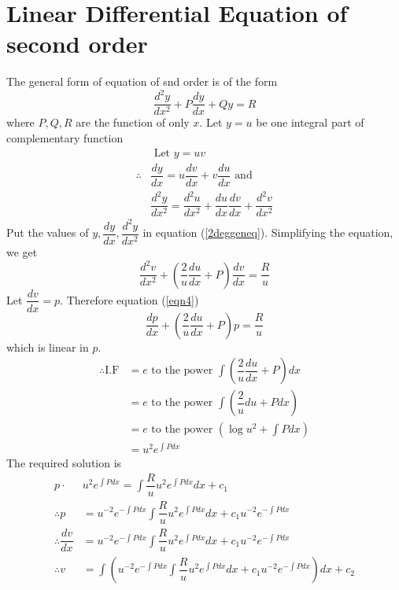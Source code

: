 \documentclass[a4paper, titlepage]{article}
\begin{document}
\section{Linear Differential Equation of second order}
The general form of equation of snd order is of the form
\begin{equation}
    \label{2deggeneq}
    \dfrac{d^2y}{dx^2} + P\dfrac{dy}{dx} + Qy = R
\end{equation}
where $P, Q, R$ are the function of only $x$.
Let $y = u$ be one integral part of complementary function
\begin{align}
    & \text{ Let } y = uv \label{eqn1} \\
    \therefore & \dfrac{dy}{dx} = u\dfrac{dv}{dx} + v\dfrac{du}{dx} \text{ and } \label{eqn2} \\
    & \dfrac{d^2y}{dx^2} = \dfrac{d^2u}{dx^2} + \dfrac{du}{dx}\dfrac{dv}{dx} + \dfrac{d^2v}{dx^2} \label{eqn3}
\end{align}
Put the values of $y, \dfrac{dy}{dx}, \dfrac{d^2y}{dx^2}$ in equation (\ref{2deggeneq}).
Simplifying the equation, we get
\begin{equation}
    \label{eqn4}
    \dfrac{d^2v}{dx^2} + \left( \dfrac{2}{u} \dfrac{du}{dx} + P \right)\dfrac{dv}{dx} = \dfrac{R}{u}
\end{equation}
Let $\dfrac{dv}{dx} = p$. Therefore equation (\ref{eqn4}) \hfill \\
\begin{equation*}
    \dfrac{dp}{dx} + \left( \dfrac{2}{u} \dfrac{du}{dx} + P \right)p = \dfrac{R}{u}
\end{equation*}
which is linear in $p$.
\begin{align*}
    \therefore \text{I.F} &= e \text{ to the power } \displaystyle\int\left( \dfrac{2}{u} \dfrac{du}{dx} + P \right)dx \\
                          &= e \text{ to the power } \displaystyle\int\left( \dfrac{2}{u}du + Pdx \right) \\
                          &= e \text{ to the power } \left( \log u^2 + \displaystyle\int Pdx \right) \\
                          &= u^2e^{\int Pdx}
\end{align*}
The required solution is 
\begin{align*}
    p\cdot & u^2e^{\int Pdx} = \displaystyle\int \dfrac{R}{u}u^2e^{\int Pdx} dx + c_1 \\
    \therefore p &= u^{-2}e^{-\int Pdx}\displaystyle\int \dfrac{R}{u}u^2e^{\int Pdx} dx + c_1u^{-2}e^{-\int Pdx} \\
    \therefore \dfrac{dv}{dx} &= u^{-2}e^{-\int Pdx}\displaystyle\int \dfrac{R}{u}u^2e^{\int Pdx} dx + c_1u^{-2}e^{-\int Pdx} \\
    \therefore v &= \displaystyle\int \left( u^{-2}e^{-\int Pdx}\displaystyle\int \dfrac{R}{u}u^2e^{\int Pdx} dx + c_1u^{-2}e^{-\int Pdx} \right) dx + c_2
\end{align*}
\end{document}
